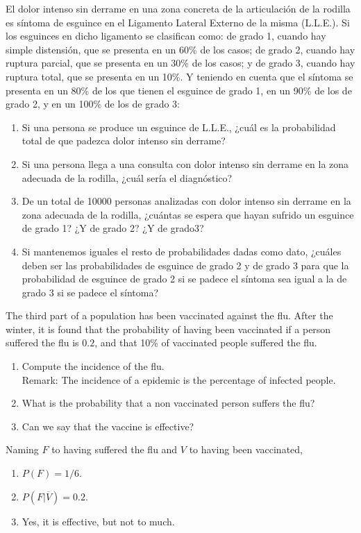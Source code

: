 {El dolor intenso sin derrame en una zona concreta de la articulación de la rodilla es síntoma de esguince en el Ligamento Lateral Externo
de la misma (L.L.E.). Si los esguinces en dicho ligamento se clasifican como: de grado 1, cuando hay simple distensión, que se presenta en
un 60\% de los casos; de grado 2, cuando hay ruptura parcial, que se presenta en un 30\% de los casos; y de grado 3, cuando hay ruptura
total, que se presenta en un 10\%. Y teniendo en cuenta que el síntoma se presenta en un 80\% de los que tienen el esguince de grado 1, en
un 90\% de los de grado 2, y en un 100\% de los de grado 3:
\begin{enumerate}
\item Si una persona se produce un esguince de L.L.E., ¿cuál es la probabilidad total de que padezca dolor intenso sin
derrame?
\item Si una persona llega a una consulta con dolor intenso sin derrame en la zona adecuada de la rodilla, ¿cuál sería
el diagnóstico?
\item De un total de 10000 personas analizadas con dolor intenso sin derrame en la zona adecuada de la rodilla,
¿cuántas se espera que hayan sufrido un esguince de grado 1?
¿Y de grado 2?
¿Y de grado3?
\item Si mantenemos iguales el resto de probabilidades dadas como dato, ¿cuáles deben ser las probabilidades de
esguince de grado 2 y de grado 3 para que la probabilidad de esguince de grado 2 si se padece el síntoma sea igual a la
de grado 3 si se padece el síntoma?
\end{enumerate}
}
{}
{}


{The third part of a population has been vaccinated against the flu.
After the winter, it is found that the probability of having been vaccinated if a person suffered the flu is $0.2$, and that 10\% of vaccinated people suffered the flu.
\begin{enumerate}
\item Compute the incidence of the flu.\\
Remark: The incidence of a epidemic is the percentage of infected people.
\item What is the probability that a non vaccinated person suffers the flu?
\item Can we say that the vaccine is effective?
\end{enumerate}
}
{Naming $F$ to having suffered the flu and $V$ to having been vaccinated,
\begin{enumerate}
\item $P(F)=1/6$.
\item $P(F|\overline{V})=0.2$.
\item Yes, it is effective, but not to much. 
\end{enumerate}
}
{}


